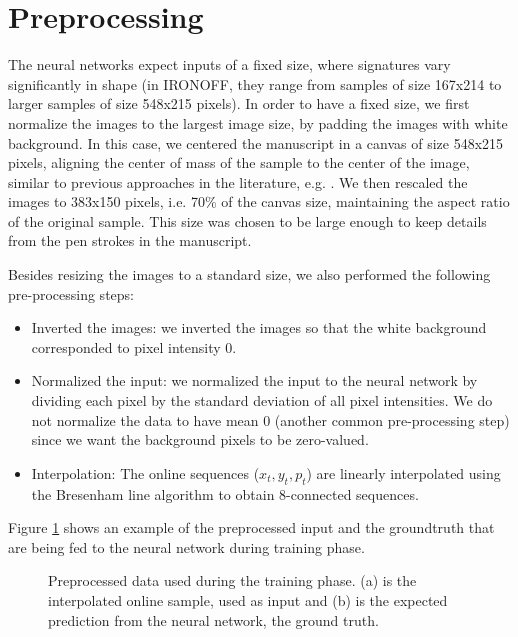 \section{Preprocessing}
The neural networks expect inputs of a fixed size, where signatures vary significantly in
shape (in IRONOFF, they range from samples of size 167x214 to larger samples of size 548x215 pixels). In order to have a fixed size, we first normalize the images to the largest image size, by padding the images with white background. In this case, we centered the manuscript in a canvas of size 548x215 pixels, aligning the center of mass of the sample to the center of the image, similar to previous approaches in the literature, e.g. \cite{pourshahabi2009offline}. We then rescaled the
images to 383x150 pixels, i.e. 70\% of the canvas size, maintaining the aspect ratio of the original sample. This size was chosen to be large enough to keep
details from the pen strokes in the manuscript.

Besides resizing the images to a standard size, we also
performed the following pre-processing steps:
\begin{itemize}
\item Inverted the images: we inverted the images so that the white background corresponded to pixel intensity
0. 
\item Normalized the input: we normalized the input to the
neural network by dividing each pixel by the standard
deviation of all pixel intensities. We do not normalize the data to have mean 0 (another common pre-processing step) since we want the
background pixels to be zero-valued.
\item Interpolation: The online sequences ($x_{t}, y_{t}, p_{t}$) are linearly interpolated using the Bresenham line algorithm \cite{bresenham} to obtain 8-connected sequences.
\end{itemize}

Figure \ref{fig_ironoff} shows an example of the preprocessed input and the groundtruth that are being fed to the neural network during training phase.



\begin{figure}[!htpb]
\centering
\hspace*{0.5in} %
\caption{Preprocessed data used during the training phase. (a) is the interpolated online sample, used as input and (b) is the expected prediction from the neural network, the ground truth. } \label{fig_ironoff}
\end{figure}



